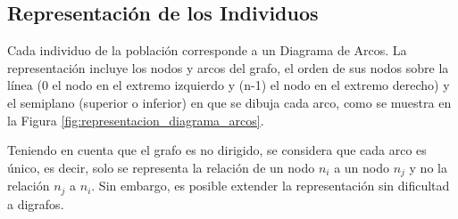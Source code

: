 	\subsection{Representación de  los Individuos}
	\label{subsec:representacion_individuos}
	Cada individuo de la población corresponde a un Diagrama de Arcos. La representación incluye  los nodos y arcos del grafo, el orden de sus nodos sobre la línea (0 el nodo en el extremo izquierdo y  (n-1) el nodo en el extremo derecho) y el semiplano   (superior o inferior) en que se dibuja cada arco, como se muestra en la Figura \ref{fig:representacion_diagrama_arcos}.
	
	
	
	
	
	
	Teniendo en cuenta que  el grafo es  no dirigido, se considera que cada arco es único, es decir, solo se representa la relación de un nodo $n_i$ a un nodo $n_j$ y no la relación $n_j$ a $n_i$. Sin embargo, es posible extender la representación sin dificultad a digrafos.
	
